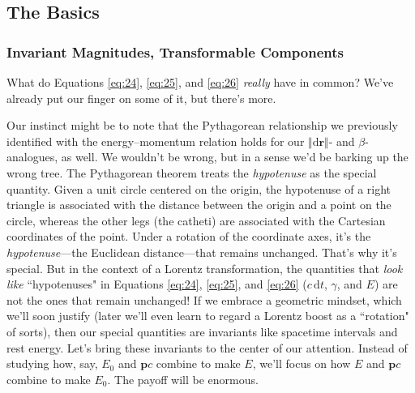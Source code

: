 \documentclass[12pt]{article}
\renewcommand{\vv}[1]{\mathbf{#1}}
\newcommand{\dd}[1]{\mathrm{d}#1}
\begin{document}
%
%


\subsection{The Basics}

\subsubsection{Invariant Magnitudes, Transformable Components}

What do Equations \ref{eq:24}, \ref{eq:25}, and \ref{eq:26} \emph{really} have in common? We've already put our finger on some of it, but there's more.

Our instinct might be to note that the Pythagorean relationship we previously identified with the energy--momentum relation holds for our $\Vert \dd \vv r \Vert$- and $\beta$-analogues, as well. We wouldn't be wrong, but in a sense we'd be barking up the wrong tree. The Pythagorean theorem treats the \emph{hypotenuse} as the special quantity. Given a unit circle centered on the origin, the hypotenuse of a right triangle is associated with the distance between the origin and a point on the circle, whereas the other legs (the catheti) are associated with the Cartesian coordinates of the point. Under a rotation of the coordinate axes, it's the \emph{hypotenuse}---the Euclidean distance---that remains unchanged. That's why it's special. But in the context of a Lorentz transformation, the quantities that \emph{look like} ``hypotenuses" in Equations \ref{eq:24}, \ref{eq:25}, and \ref{eq:26} ($c \, \dd t$, $\gamma$, and $E$) are not the ones that remain unchanged! If we embrace a geometric mindset, which we'll soon justify (later we'll even learn to regard a Lorentz boost as a ``rotation" of sorts), then our special quantities are invariants like spacetime intervals and rest energy. Let's bring these invariants to the center of our attention. Instead of studying how, say, $E_0$ and $\vv p c$ combine to make $E$, we'll focus on how $E$ and $\vv p c$ combine to make $E_0$. The payoff will be enormous.
\end{document}
